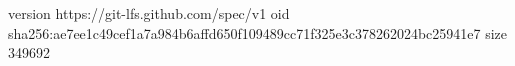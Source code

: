 version https://git-lfs.github.com/spec/v1
oid sha256:ae7ee1c49cef1a7a984b6affd650f109489cc71f325e3c378262024bc25941e7
size 349692
